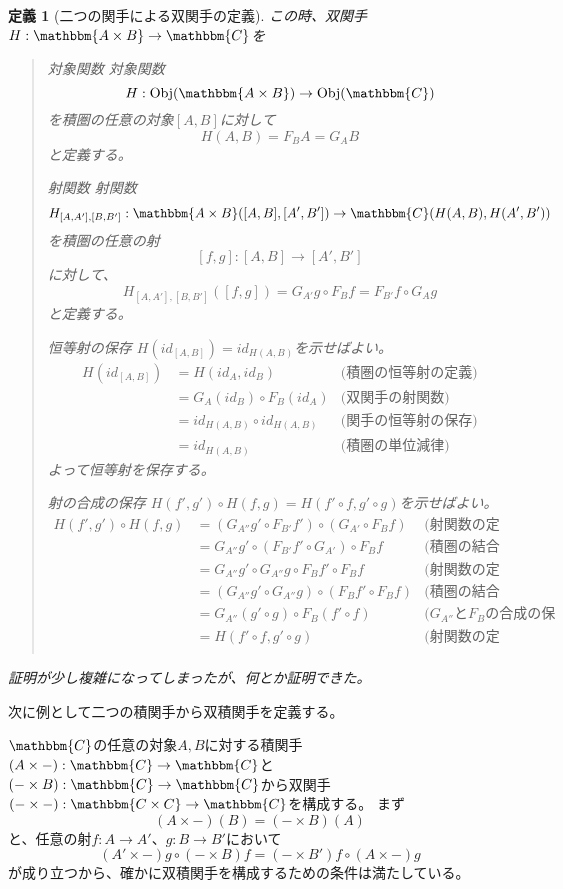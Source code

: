 \documentclass[uplatex,dvipdfmx]{jsarticle}
\newcommand{\cat}[1]{\mathbbm{#1}}
\newcommand{\arrow}{\rightarrow}
\newcommand{\functor}[3]{#1:\cat{#2}\arrow \cat{#3}}
\newcommand{\obj}[1]{\mathrm{Obj}(\cat{#1})}
\newcommand{\mor}[3]{#1:#2\arrow #3}
\newcommand{\arset}[3]{\cat{#1}(#2,#3)}
\newcommand{\pcobj}[1]{[#1]}
\newtheorem{define}[proof]{定義}
\numberwithin{proof}{subsection}
\newenvironment{mydescription}
{\begin{description}
  \setlength{\parskip}{0.5cm}
}
{\end{description}}
\begin{document}
\begin{define}[二つの関手による双関手の定義]
		この時、双関手$\functor{H}{A\times B}{C}$を
		\begin{quote}
			\begin{mydescription}
				\item[対象関数] 対象関数\[\mor{H}{\obj{A\times B}}{\obj{C}}\]を積圏の任意の対象$\pcobj{A,B}$に対して
				\[H(A,B)={F_B}A={G_A}B\]と定義する。
				\item[射関数]射関数\[\mor{H_{\pcobj{A,A'},\pcobj{B,B'}}}{\arset{A\times B}{\pcobj{A,B}}{\pcobj{A',B'}}}{\arset{C}{H(A,B)}{H(A',B')}}\]を積圏の任意の射\[\mor{\pcobj{f,g}}{\pcobj{A,B}}{\pcobj{A',B'}}\]に対して、\[H_{\pcobj{A,A'},\pcobj{B,B'}}(\pcobj{f,g})={G_{A'}}g\circ {F_B}f = {F_{B'}}f\circ {G_A}g\]と定義する。
				\item[恒等射の保存]$H(id_{\pcobj{A,B}})=id_{H(A,B)}$を示せばよい。
				\begin{align*}
					H(id_{\pcobj{A,B}})&=H(id_A,id_B)&\text{(積圏の恒等射の定義)}\\
					&=G_A(id_B)\circ F_B(id_A)&\text{(双関手の射関数)}\\
					&=id_{H(A,B)}\circ id_{H(A,B)}&\text{(関手の恒等射の保存)}\\
					&=id_{H(A,B)}&\text{(積圏の単位減律)}
				\end{align*}
				よって恒等射を保存する。
				\item[射の合成の保存]$H(f',g')\circ H(f,g)=H(f'\circ f,g'\circ g)$を示せばよい。
				\begin{align*}
					H(f',g')\circ H(f,g)&=(G_{A''}g'\circ F_{B'}f')\circ(G_{A'}\circ F_Bf)&\text{(射関数の定義)}\\
					&=G_{A''}g'\circ (F_{B'}f'\circ G_{A'})\circ  F_Bf&\text{(積圏の結合律)}\\
					&=G_{A''}g'\circ G_{A''}g\circ F_Bf'\circ  F_Bf&\text{(射関数の定義)}\\
					&=(G_{A''}g'\circ G_{A''}g)\circ (F_Bf'\circ  F_Bf)&\text{(積圏の結合則)}\\
					&=G_{A''}(g'\circ g)\circ F_B(f'\circ f)&\text{($G_{A''}$と$F_B$の合成の保存)}\\
					&=H(f'\circ f,g'\circ g)&\text{(射関数の定義)}\\
				\end{align*}
			\end{mydescription}
		\end{quote}
		証明が少し複雑になってしまったが、何とか証明できた。
	\end{define}
	次に例として二つの積関手から双積関手を定義する。

	$\cat{C}$の任意の対象$A,B$に対する積関手$\functor{(A\times -)}{C}{C}$と$\functor{(-\times B)}{C}{C}$から双関手$\functor{(-\times -)}{C\times C}{C}$を構成する。
	まず\[(A\times -)(B)=(-\times B)(A)\]と、任意の射$\mor{f}{A}{A'}$、$\mor{g}{B}{B'}$において
	\[(A'\times -)g\circ (-\times B)f=(-\times B')f\circ(A\times -)g\]が成り立つから、確かに双積関手を構成するための条件は満たしている。
\end{document}
